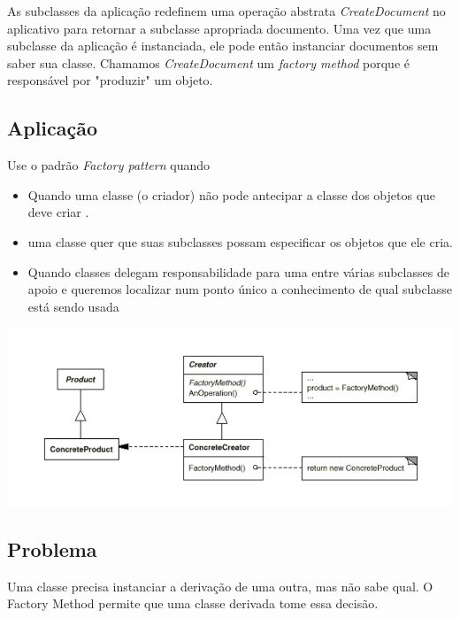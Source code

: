 As subclasses da aplicação redefinem uma operação abstrata \emph{CreateDocument} no 
aplicativo para retornar a subclasse apropriada documento. Uma vez que uma subclasse da aplicação é instanciada, ele pode então instanciar documentos sem saber sua classe. Chamamos \emph{CreateDocument} um \emph{factory method} porque é
responsável por "produzir" um objeto.

\subsection{Aplicação}
\label{sub:fac_aplica}

Use o padrão \emph{Factory pattern} quando

\begin{itemize}
	\item Quando uma classe (o criador) não pode antecipar a classe dos objetos que deve criar
.	\item uma classe quer que suas subclasses possam especificar os objetos que ele cria.
	\item Quando classes delegam responsabilidade para uma entre várias subclasses de apoio e
queremos localizar num ponto único a conhecimento de qual subclasse está sendo usada

\end{itemize}



\begin{center}
	\includegraphics[scale=0.50]{Figuras/image2.jpg}
	\label{fig:diagrama2}
\end{center}


\subsection{Problema}
\label{sub:fac_problema}

Uma classe precisa instanciar a derivação de uma outra, mas não sabe qual. O Factory
Method permite que uma classe derivada tome essa decisão.

